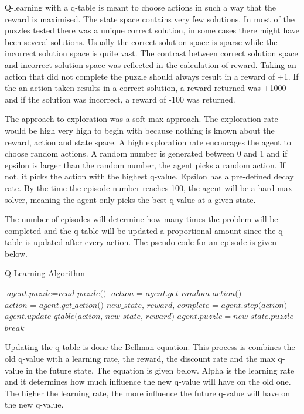 \documentclass{svproc}
\begin{document}
Q-learning with a q-table is meant to choose actions in such a way that the reward is maximised. The state space contains very few solutions. In most of the puzzles tested there was a unique correct solution, in some cases there might have been several solutions. Usually the correct solution space is sparse while the incorrect solution space is quite vast. The contrast between correct solution space and incorrect solution space was reflected in the calculation of reward. Taking an action that did not complete the puzzle should always result in a reward of +1. If the an action taken results in a correct solution, a reward returned was +1000 and if the solution was incorrect, a reward of -100 was returned.

The approach to exploration was a soft-max approach. The exploration rate would be high very high to begin with because nothing is known about the reward, action and state space. A high exploration rate encourages the agent to choose random actions. A random number is generated between 0 and 1 and if epsilon is larger than the random number, the agent picks a random action. If not, it picks the action with the highest q-value. Epsilon has a pre-defined decay rate. By the time the episode number reaches 100, the agent will be a hard-max solver, meaning the agent only picks the best q-value at a given state.

The number of episodes will determine how many times the problem will be completed and the q-table will be updated a proportional amount since the q-table is updated after every action. The pseudo-code for an episode is given below.

\begin{algorithm}
	\caption{Q-Learning Algorithm}\label{euclid}
	\begin{algorithmic}[1]
		\State $\textit{agent.puzzle} = \textit{read\_puzzle()}$
		\State $\textit{action = agent.get\_random\_action()}$
		\Else
		\State $\textit{action = agent.get\_action()}$
		\EndIf
		\State $\textit{new\_state, reward, complete = agent.step(action)}$
		\State $\textit{agent.update\_qtable(action, new\_state, reward)}$
		\State $agent.puzzle = new\_state.puzzle$
		\State $\textit{break}$
		\EndIf
		\EndFor
		\EndFor
	\end{algorithmic}
\end{algorithm}

Updating the q-table is done the Bellman equation. This process is combines the old q-value with a learning rate, the reward, the discount rate and the max q-value in the future state. The equation is given below. Alpha is the learning rate and it determines how much influence the new q-value will have on the old one. The higher the learning rate, the more influence the future q-value will have on the new q-value.
\end{document}
